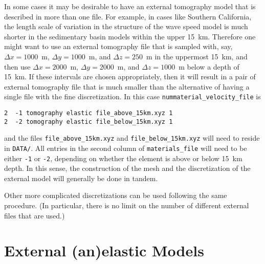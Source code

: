 In some cases it may be desirable to have an external tomography model that is described in more than one file. For example, in cases like Southern California, the length scale of variation in the structure of the wave speed model is much shorter in the sedimentary basin models within the upper 15~km. Therefore one might want to use an external tomography file that is sampled with, say, $\Delta x = 1000$~m, $\Delta y = 1000$~m, and $\Delta z = 250$~m in the uppermost 15~km, and then use $\Delta x = 2000$~m, $\Delta y = 2000$~m, and $\Delta z = 1000$~m below a depth of 15~km. If these intervals are chosen appropriately, then it will result in a pair of external tomography file that is much smaller than the alternative of having a single file with the fine discretization. In this case  \texttt{nummaterial\_velocity\_file} is
%
\begin{verbatim}
2  -1 tomography elastic file_above_15km.xyz 1
2  -2 tomography elastic file_below_15km.xyz 1
\end{verbatim}
%
and the files \texttt{file\_above\_15km.xyz} and \texttt{file\_below\_15km.xyz} will need to reside in \texttt{DATA/}.  All entries in the second column of \texttt{materials\_file} will need to be either \texttt{-1} or \texttt{-2}, depending on whether the element is above or below 15~km depth. In this sense, the construction of the mesh and the discretization of the external model will generally be done in tandem.\newline

Other more complicated discretizations can be used following the same procedure. (In particular, there is no limit on the number of different external files that are used.)



\section{External (an)elastic Models}\label{sec:Anelastic-Models}

